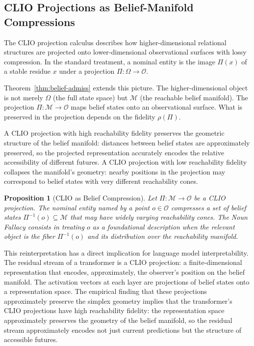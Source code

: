 \documentclass[12pt, a4paper]{article}
\theoremstyle{plain}
\newtheorem{proposition}[theorem]{Proposition}
\theoremstyle{definition}
\theoremstyle{remark}
\begin{document}
\subsection{CLIO Projections as Belief-Manifold Compressions}

The CLIO projection calculus describes how higher-dimensional relational
structures are projected onto lower-dimensional observational surfaces
with lossy compression. In the standard treatment, a nominal entity is the
image $\Pi(x)$ of a stable residue $x$ under a projection $\Pi: \Omega \to
\mathcal{O}$.

Theorem~\ref{thm:belief-admiss} extends this picture. The higher-dimensional
object is not merely $\Omega$ (the full state space) but $\mathcal{M}$
(the reachable belief manifold). The projection $\Pi: \mathcal{M} \to
\mathcal{O}$ maps belief states onto an observational surface. What is
preserved in the projection depends on the fidelity $\rho(\Pi)$.

A CLIO projection with high reachability fidelity preserves the geometric
structure of the belief manifold: distances between belief states are
approximately preserved, so the projected representation accurately
encodes the relative accessibility of different futures. A CLIO projection
with low reachability fidelity collapses the manifold's geometry: nearby
positions in the projection may correspond to belief states with very
different reachability cones.

\begin{proposition}[CLIO as Belief Compression]
Let $\Pi: \mathcal{M} \to \mathcal{O}$ be a CLIO projection. The nominal
entity named by a point $o \in \mathcal{O}$ compresses a set of belief
states $\Pi^{-1}(o) \subseteq \mathcal{M}$ that may have widely varying
reachability cones. The Noun Fallacy consists in treating $o$ as a
foundational description when the relevant object is the fiber
$\Pi^{-1}(o)$ and its distribution over the reachability manifold.
\end{proposition}

This reinterpretation has a direct implication for language model
interpretability. The residual stream of a transformer is a CLIO
projection: a finite-dimensional representation that encodes, approximately,
the observer's position on the belief manifold. The activation vectors
at each layer are projections of belief states onto a representation
space. The empirical finding that these projections approximately preserve
the simplex geometry \citep{shai2025} implies that the transformer's
CLIO projections have high reachability fidelity: the representation space
approximately preserves the geometry of the belief manifold, so the
residual stream approximately encodes not just current predictions but
the structure of accessible futures.
\end{document}
